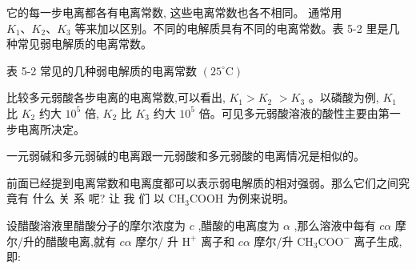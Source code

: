 \documentclass[10pt]{article}
\begin{document}
它的每一步电离都各有电离常数, 这些电离常数也各不相同。 通常用 \({K}_{1}\text{、}{K}_{2}\text{、}{K}_{3}\) 等来加以区别。不同的电解质具有不同的电离常数。表 5-2 里是几种常见弱电解质的电离常数。

表 5-2 常见的几种弱电解质的电离常数 \(\left( {{25}^{ \circ }\mathrm{C}}\right)\)

\begin{center}
\end{center}

比较多元弱酸各步电离的电离常数,可以看出, \({K}_{1} > {K}_{2}\) \(> {K}_{3}\) 。以磷酸为例, \({K}_{1}\) 比 \({K}_{2}\) 约大 \({10}^{5}\) 倍, \({K}_{2}\) 比 \({K}_{3}\) 约大 \({10}^{5}\) 倍。可见多元弱酸溶液的酸性主要由第一步电离所决定。

一元弱碱和多元弱碱的电离跟一元弱酸和多元弱酸的电离情况是相似的。

前面已经提到电离常数和电离度都可以表示弱电解质的相对强弱。那么它们之间究竟有 什么 关 系 呢? 让 我 们 以 \({\mathrm{{CH}}}_{3}\mathrm{{COOH}}\) 为例来说明。

设醋酸溶液里醋酸分子的摩尔浓度为 \(c\) ,醋酸的电离度为 \(\alpha\) ,那么溶液中每有 \({c\alpha }\) 摩尔/升的醋酸电离,就有 \({c\alpha }\) 摩尔/ 升 \({\mathrm{H}}^{ + }\) 离子和 \({c\alpha }\) 摩尔/升 \({\mathrm{{CH}}}_{3}{\mathrm{{COO}}}^{ - }\) 离子生成,即:
\end{document}
